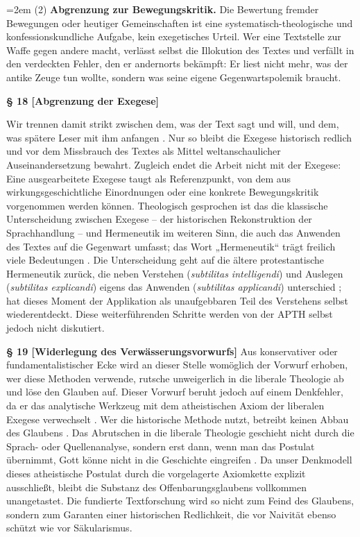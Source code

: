 \documentclass[11pt,a4paper]{article}
\makeatletter
\newcommand{\apth}{{\apthfont APTH}\hspace{0.15em}\xspace}
\newcommand{\subpar}[1]{%
  \begingroup
  \leftskip=2em %
  \noindent#1\par
  \endgroup
}
\newcommand{\apthsec}[3]{%
  \phantomsection%
  \def\@currentlabel{#1}%
  \label{sec:#3}%
  \textbf{§ #1 [#2]}%
}
\makeatother
\begin{document}
\subpar{(2) \textbf{Abgrenzung zur Bewegungskritik.} Die Bewertung fremder Bewegungen oder heutiger Gemeinschaften ist eine systematisch-theologische und konfessionskundliche Aufgabe, kein exegetisches Urteil. Wer eine Textstelle zur Waffe gegen andere macht, verlässt selbst die Illokution des Textes und verfällt in den verdeckten Fehler, den er andernorts bekämpft: Er liest nicht mehr, was der antike Zeuge tun wollte, sondern was seine eigene Gegenwartspolemik braucht.}

\apthsec{18}{Abgrenzung der Exegese}{abgrenzung-exegese}
Wir trennen damit strikt zwischen dem, was der Text sagt und will, und dem, was spätere Leser mit ihm anfangen \citep{hirsch1967}. Nur so bleibt die Exegese historisch redlich und vor dem Missbrauch des Textes als Mittel weltanschaulicher Auseinandersetzung bewahrt. Zugleich endet die Arbeit nicht mit der Exegese: Eine ausgearbeitete Exegese taugt als Referenzpunkt, von dem aus wirkungsgeschichtliche Einordnungen oder eine konkrete Bewegungskritik vorgenommen werden können. Theologisch gesprochen ist das die klassische Unterscheidung zwischen Exegese – der historischen Rekonstruktion der Sprachhandlung – und Hermeneutik im weiteren Sinn, die auch das Anwenden des Textes auf die Gegenwart umfasst; das Wort „Hermeneutik“ trägt freilich viele Bedeutungen \citep{ebeling1959}. Die Unterscheidung geht auf die ältere protestantische Hermeneutik zurück, die neben Verstehen (\textit{subtilitas intelligendi}) und Auslegen (\textit{subtilitas explicandi}) eigens das Anwenden (\textit{subtilitas applicandi}) unterschied \citep{rambach1723}; \citet{gadamer1960} hat dieses Moment der Applikation als unaufgebbaren Teil des Verstehens selbst wiederentdeckt. Diese weiterführenden Schritte werden von der \apth selbst jedoch nicht diskutiert.

\apthsec{19}{Widerlegung des Verwässerungsvorwurfs}{verwaesserung} Aus konservativer oder fundamentalistischer Ecke wird an dieser Stelle womöglich der Vorwurf erhoben, wer diese Methoden verwende, rutsche unweigerlich in die liberale Theologie ab und löse den Glauben auf. Dieser Vorwurf beruht jedoch auf einem Denkfehler, da er das analytische Werkzeug mit dem atheistischen Axiom der liberalen Exegese verwechselt \citep{schlatter1905,troeltsch1913}. Wer die historische Methode nutzt, betreibt keinen Abbau des Glaubens \citep{stuhlmacher1979,wright1992,enns2005,sparks2008}. Das Abrutschen in die liberale Theologie geschieht nicht durch die Sprach- oder Quellenanalyse, sondern erst dann, wenn man das Postulat übernimmt, Gott könne nicht in die Geschichte eingreifen \citep{harvey1966,lessing1777}. Da unser Denkmodell dieses atheistische Postulat durch die vorgelagerte Axiomkette explizit ausschließt, bleibt die Substanz des Offenbarungsglaubens vollkommen unangetastet. Die fundierte Textforschung wird so nicht zum Feind des Glaubens, sondern zum Garanten einer historischen Redlichkeit, die vor Naivität ebenso schützt wie vor Säkularismus.
\end{document}
